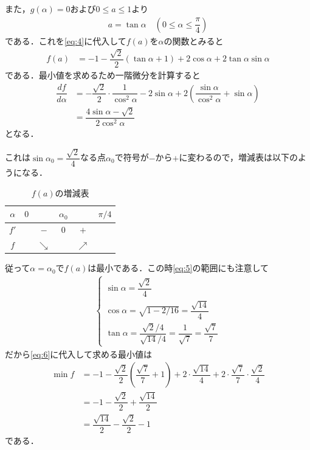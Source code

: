 \documentclass[../../main.tex]{subfiles}
\begin{document}
また，$g(\alpha)=0$および$0\le a \le 1$より
\begin{align}
  a=\tan\alpha \quad \left(0\le\alpha \le \dfrac{\pi}{4}\right) \label{eq:5}
\end{align}
である．これを\cref{eq:4}に代入して$f(a)$を$\alpha$の関数とみると
\begin{align}
  f(a)
  &=-1-\dfrac{\sqrt{2}}{2}(\tan\alpha+1)+2\cos\alpha+2\tan\alpha\sin\alpha  \label{eq:6}
\end{align}
である．最小値を求めるため一階微分を計算すると
\begin{align}
  \dfrac{df}{d\alpha}
  &=-\dfrac{\sqrt{2}}{2}\cdot\dfrac{1}{\cos^2\alpha}-2\sin\alpha+2\left(\dfrac{\sin\alpha}{\cos^2\alpha}+\sin\alpha\right) \\
  &=\dfrac{4\sin\alpha-\sqrt{2}}{2\cos^2\alpha}
\end{align}
となる．

これは$\sin\alpha_0=\dfrac{\sqrt{2}}{4}$なる点$\alpha_0$で符号が$-$から$+$に変わるので，増減表は以下のようになる．

\begin{table}[htb]
  \centering
  \caption{$f(a)$の増減表}
  \begin{tabular}{c|ccccc}
    $\alpha$ & $0$ & & $\alpha_0$ & & $\pi/4$ \\
    \hline
    $f'$ & & $-$ & $0$ & $+$ & \\
    \hline
    $f$ & & $\searrow$ & & $\nearrow$ &
  \end{tabular}
\end{table}

従って$\alpha=\alpha_0$で$f(a)$は最小である．この時\cref{eq:5}の範囲にも注意して
\begin{align}
  \begin{cases}
    \sin\alpha=\dfrac{\sqrt{2}}{4} \\
    \cos\alpha=\sqrt{1-2/16}=\dfrac{\sqrt{14}}{4} \\
    \tan\alpha=\dfrac{\sqrt{2}/4}{\sqrt{14}/4}=\dfrac{1}{\sqrt{7}}=\dfrac{\sqrt{7}}{7}
  \end{cases}
\end{align}
だから\cref{eq:6}に代入して求める最小値は
\begin{align}
  \min f
  &=-1-\dfrac{\sqrt{2}}{2}\left(\dfrac{\sqrt{7}}{7}+1\right)+2\cdot\dfrac{\sqrt{14}}{4}+2\cdot\dfrac{\sqrt{7}}{7}\cdot\dfrac{\sqrt{2}}{4} \\
  &=-1-\dfrac{\sqrt{2}}{2}+\dfrac{\sqrt{14}}{2} \\
  &=\dfrac{\sqrt{14}}{2}-\dfrac{\sqrt{2}}{2}-1
\end{align}
である．

\newpage
\end{document}
